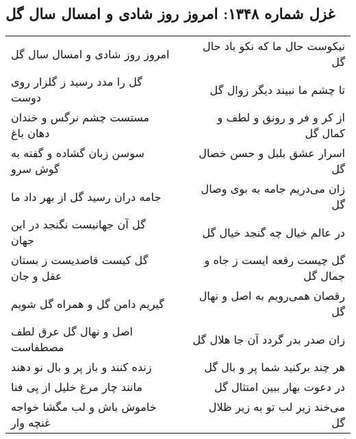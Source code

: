 \begin{center}
\section*{غزل شماره ۱۳۴۸: امروز روز شادی و امسال سال گل}
\label{sec:1348}
\begin{longtable}{l p{0.5cm} r}
امروز روز شادی و امسال سال گل
&&
نیکوست حال ما که نکو باد حال گل
\\
گل را مدد رسید ز گلزار روی دوست
&&
تا چشم ما نبیند دیگر زوال گل
\\
مستست چشم نرگس و خندان دهان باغ
&&
از کر و فر و رونق و لطف و کمال گل
\\
سوسن زبان گشاده و گفته به گوش سرو
&&
اسرار عشق بلبل و حسن خصال گل
\\
جامه دران رسید گل از بهر داد ما
&&
زان می‌دریم جامه به بوی وصال گل
\\
گل آن جهانیست نگنجد در این جهان
&&
در عالم خیال چه گنجد خیال گل
\\
گل کیست قاصدیست ز بستان عقل و جان
&&
گل چیست رقعه ایست ز جاه و جمال گل
\\
گیریم دامن گل و همراه گل شویم
&&
رقصان همی‌رویم به اصل و نهال گل
\\
اصل و نهال گل عرق لطف مصطفاست
&&
زان صدر بدر گردد آن جا هلال گل
\\
زنده کنند و باز پر و بال نو دهند
&&
هر چند برکنید شما پر و بال گل
\\
مانند چار مرغ خلیل از پی فنا
&&
در دعوت بهار ببین امتثال گل
\\
خاموش باش و لب مگشا خواجه غنچه وار
&&
می‌خند زیر لب تو به زیر ظلال گل
\\
\end{longtable}
\end{center}
